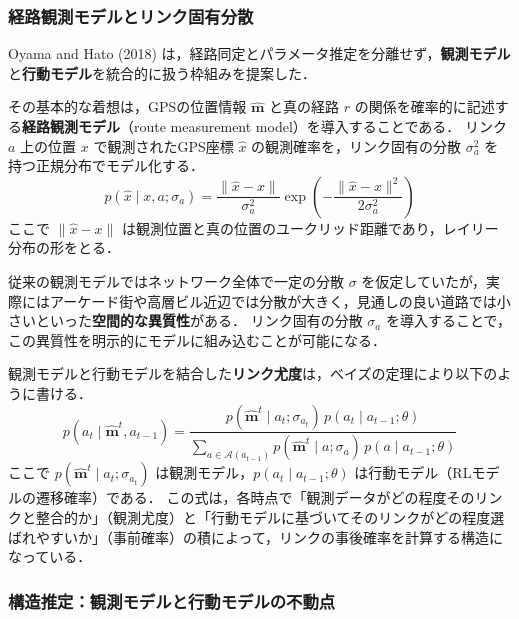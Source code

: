 \subsubsection{経路観測モデルとリンク固有分散}\label{sssec:route_measurement}

Oyama and Hato (2018) \cite{Oyama2018gpseng} は，経路同定とパラメータ推定を分離せず，\textbf{観測モデル}と\textbf{行動モデル}を統合的に扱う枠組みを提案した．

その基本的な着想は，GPSの位置情報 $\hat{\bm{m}}$ と真の経路 $r$ の関係を確率的に記述する\textbf{経路観測モデル}（route measurement model）を導入することである．
リンク $a$ 上の位置 $x$ で観測されたGPS座標 $\hat{x}$ の観測確率を，リンク固有の分散 $\sigma_a^2$ を持つ正規分布でモデル化する．
\begin{equation}\label{eq:measurement_prob}
  p(\hat{x} \mid x, a; \sigma_a) = \frac{\|\hat{x} - x\|}{\sigma_a^2} \exp\!\left(-\frac{\|\hat{x} - x\|^2}{2\sigma_a^2}\right)
\end{equation}
ここで $\|\hat{x} - x\|$ は観測位置と真の位置のユークリッド距離であり，レイリー分布の形をとる．

従来の観測モデルではネットワーク全体で一定の分散 $\sigma$ を仮定していたが，実際にはアーケード街や高層ビル近辺では分散が大きく，見通しの良い道路では小さいといった\textbf{空間的な異質性}がある．
リンク固有の分散 $\sigma_a$ を導入することで，この異質性を明示的にモデルに組み込むことが可能になる．

観測モデルと行動モデルを結合した\textbf{リンク尤度}は，ベイズの定理により以下のように書ける．
\begin{equation}\label{eq:link_likelihood}
  p(a_t \mid \hat{\bm{m}}^t, a_{t-1}) = \frac{p(\hat{\bm{m}}^t \mid a_t; \sigma_{a_t}) \, p(a_t \mid a_{t-1}; \theta)}{\sum_{a \in \mathcal{A}(a_{t-1})} p(\hat{\bm{m}}^t \mid a; \sigma_a) \, p(a \mid a_{t-1}; \theta)}
\end{equation}
ここで $p(\hat{\bm{m}}^t \mid a_t; \sigma_{a_t})$ は観測モデル，$p(a_t \mid a_{t-1}; \theta)$ は行動モデル（RLモデルの遷移確率）である．
この式は，各時点で「観測データがどの程度そのリンクと整合的か」（観測尤度）と「行動モデルに基づいてそのリンクがどの程度選ばれやすいか」（事前確率）の積によって，リンクの事後確率を計算する構造になっている．

\subsubsection{構造推定：観測モデルと行動モデルの不動点}\label{sssec:structural_estimation}

